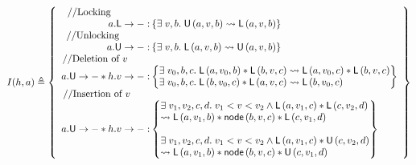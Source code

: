 \[
	I(h, a) \eqdef 
	\left\{
	\begin{array}{r @ {\hspace*{2pt}}l}
		\text{//Locking}\hspace*{1.4cm}&\\
		\lockT{a}: &\left\{ \exsts{v, b} \unlockedNode{a}{v}{b} \swap \lockedNode{a}{v}{b}\right\}\\
		
		\text{//Unlocking}\hspace*{1.1cm}&\\
		\unlockT{a}: & \left\{ \exsts{v, b} \lockedNode{a}{v}{b} \swap \unlockedNode{a}{v}{b}\right\}\\ 
		
		\text{//Deletion of } v \hspace*{0.8cm}&\\
		\unlockT{a} * \valueT{h}{v}: &
		\left\{
		\begin{array}{@{} l @{}}
			\exsts{v_0, b, c} \lockedNode{a}{v_0}{b} * \lockedNode{b}{v}{c} \swap \lockedNode{a}{v_0}{c} * \lockedNode{b}{v}{c}\\
			\exsts{v_0, b, c} \lockedNode{b}{v_0}{c} * \lockedNode{a}{v}{c} \swap \lockedNode{b}{v_0}{c}
			
		\end{array}
		\right\}\\ 

		
		\text{//Insertion of } v \hspace*{0.7cm}&\\
		\unlockT{a} * \valueT{h}{v}: &
		\left\{
		\begin{array}{@{} l @{}}
			\exsts{v_1, v_2, c, d} v_1 < v < v_2 \land \lockedNode{a}{v_1}{c} * \lockedNode{c}{v_2}{d} \\
			 \swap \lockedNode{a}{v_1}{b} * \node{b}{v}{c} *  \lockedNode{c}{v_1}{d}\\\\
			 
			 \exsts{v_1, v_2, c, d} v_1 < v < v_2 \land \lockedNode{a}{v_1}{c} * \unlockedNode{c}{v_2}{d} \\
			\swap \lockedNode{a}{v_1}{b} * \node{b}{v}{c} *  \unlockedNode{c}{v_1}{d}
						
		\end{array}
		\right\}\\ 
		
	\end{array}
	\right\}
\]
%
